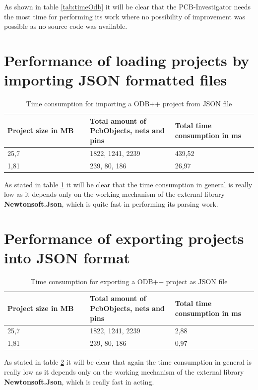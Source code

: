 As shown in table \ref{tab:timeOdb} it will be clear that the \ac{PCB}-Investigator needs the most time for performing its work where no possibility of improvement was possible as no source code was available.

	\section{Performance of loading projects by importing JSON formatted files}
\begin{table}[!h]
    \centering
     \begin{tabular}{p{0.33\linewidth} | p{0.34\linewidth} | p{0.33\linewidth}}
      Project size in MB & Total amount of PcbObjects, nets and pins & Total time consumption in ms \\ \hline
      25,7 & 1822, 1241, 2239 & 439,52 \\ \hline
      1,81 & 239, 80, 186 & 26,97 \\ 
    \end{tabular}
    \caption{Time consumption for importing a \ac{ODB}++ project from \ac{JSON} file}
    \label{tab:timeImport}
\end{table}
	
As stated in table \ref{tab:timeImport} it will be clear that the time consumption in general is really low as it depends only on the working mechanism of the external library \textbf{Newtonsoft.Json}, which is quite fast in performing its parsing work.

	\section{Performance of exporting projects into JSON format}

\begin{table}[!h]
    \centering
    \begin{tabular}{p{0.33\linewidth} | p{0.34\linewidth} | p{0.33\linewidth}}
      Project size in MB & Total amount of PcbObjects, nets and pins & Total time consumption in ms \\ \hline
      25,7 & 1822, 1241, 2239 & 2,88 \\ \hline
      1,81 & 239, 80, 186 & 0,97 \\ 
    \end{tabular}
    \caption{Time consumption for exporting a \ac{ODB}++ project as \ac{JSON} file}
    \label{tab:timeExport}
\end{table}

As stated in table \ref{tab:timeExport} it will be clear that again the time consumption in general is really low as it depends only on the working mechanism of the external library \textbf{Newtonsoft.Json}, which is really fast in acting.

